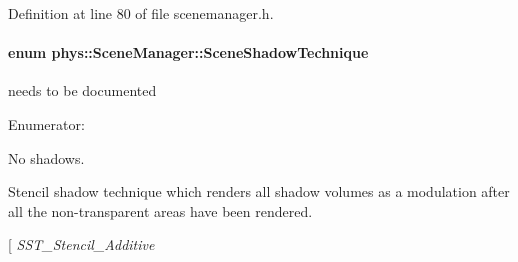 Definition at line 80 of file scenemanager.h.

\hypertarget{classphys_1_1SceneManager_a427f1bbb52c11ad07352ae01d8b3c746}{
\paragraph[{SceneShadowTechnique}]{\setlength{\rightskip}{0pt plus 5cm}enum {\bf phys::SceneManager::SceneShadowTechnique}}\hfill}
\label{dd/da8/classphys_1_1SceneManager_a427f1bbb52c11ad07352ae01d8b3c746}


needs to be documented 

\begin{Desc}
\item[Enumerator: ]\par
\begin{description}
\item[{\em 
\hypertarget{classphys_1_1SceneManager_a427f1bbb52c11ad07352ae01d8b3c746ad96e23ac363ae9de73e2d3816ae66f2e}{
SST\_\-None}
\label{dd/da8/classphys_1_1SceneManager_a427f1bbb52c11ad07352ae01d8b3c746ad96e23ac363ae9de73e2d3816ae66f2e}
}]No shadows. \item[{\em 
\hypertarget{classphys_1_1SceneManager_a427f1bbb52c11ad07352ae01d8b3c746a9b11aebab7ffc5ff359f5a49b4ff5e7d}{
SST\_\-Stencil\_\-Modulative}
\label{dd/da8/classphys_1_1SceneManager_a427f1bbb52c11ad07352ae01d8b3c746a9b11aebab7ffc5ff359f5a49b4ff5e7d}
}]Stencil shadow technique which renders all shadow volumes as a modulation after all the non-\/transparent areas have been rendered. \item[{\em 
\hypertarget{classphys_1_1SceneManager_a427f1bbb52c11ad07352ae01d8b3c746a17ba96aa6b125ac6c787851815370d97}{
SST\_\-Stencil\_\-Additive}
\label{dd/da8/classphys_1_1SceneManager_a427f1bbb52c11ad07352ae01d8b3c746a17ba96aa6b125ac6c787851815370d97}
}
\end{description}
\end{Desc}
